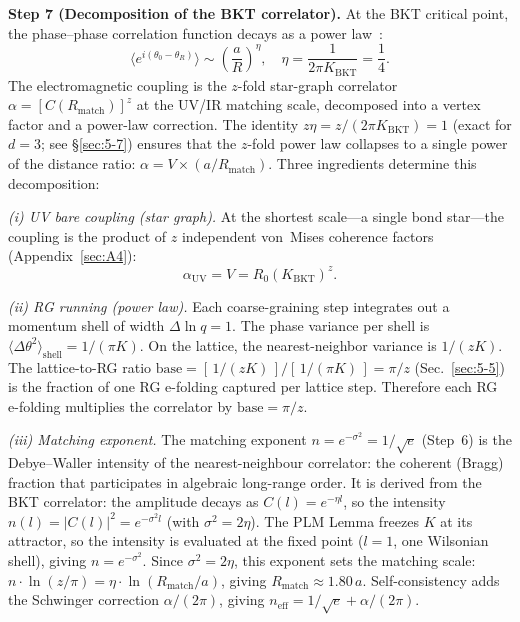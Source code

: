 \documentclass[aps,prd,onecolumn,superscriptaddress,floatfix,12pt]{revtex4-2}
\newcommand{\Rzero}{R_0}
\newcommand{\KBKT}{K_{\text{BKT}}}
\begin{document}
\textbf{Step 7 (Decomposition of the BKT correlator).} At the BKT critical point, the phase--phase correlation function decays as a power law~\cite{Kosterlitz1974}:
\begin{equation}\label{eq:bkt-corr}
\langle e^{i(\theta_0 - \theta_R)} \rangle \sim \left(\frac{a}{R}\right)^{\!\eta}, \quad \eta = \frac{1}{2\pi \KBKT} = \frac{1}{4}.
\end{equation}
The electromagnetic coupling is the $z$-fold star-graph correlator $\alpha = [C(R_{\text{match}})]^z$ at the UV/IR matching scale, decomposed into a vertex factor and a power-law correction.  The identity $z\eta = z/(2\pi\KBKT) = 1$ (exact for $d{=}3$; see \S\ref{sec:5-7}) ensures that the $z$-fold power law collapses to a single power of the distance ratio: $\alpha = V \times (a/R_{\text{match}})$.  Three ingredients determine this decomposition:

\emph{(i) UV bare coupling (star graph).} At the shortest scale---a single bond star---the coupling is the product of $z$ independent von~Mises coherence factors (Appendix~\ref{sec:A4}):
\begin{equation}
\alpha_{\text{UV}} = V = \Rzero(\KBKT)^z.
\end{equation}

\emph{(ii) RG running (power law).} Each coarse-graining step integrates out a momentum shell of width $\Delta\ln q = 1$. The phase variance per shell is $\langle\Delta\theta^2\rangle_{\text{shell}} = 1/(\pi K)$. On the lattice, the nearest-neighbor variance is $1/(zK)$. The lattice-to-RG ratio $\text{base} = [\,1/(zK)\,]/[\,1/(\pi K)\,] = \pi/z$ (Sec.~\ref{sec:5-5}) is the fraction of one RG e-folding captured per lattice step. Therefore each RG e-folding multiplies the correlator by $\text{base} = \pi/z$.

\emph{(iii) Matching exponent.} The matching exponent $n = e^{-\sigma^2} = 1/\sqrt{e}$ (Step~6) is the Debye--Waller intensity of the nearest-neighbour correlator: the coherent (Bragg) fraction that participates in algebraic long-range order.  It is derived from the BKT correlator: the amplitude decays as $C(l) = e^{-\eta l}$, so the intensity $n(l) = |C(l)|^2 = e^{-\sigma^2 l}$ (with $\sigma^2 = 2\eta$).  The PLM Lemma freezes $K$ at its attractor, so the intensity is evaluated at the fixed point ($l = 1$, one Wilsonian shell), giving $n = e^{-\sigma^2}$.  Since $\sigma^2 = 2\eta$, this exponent sets the matching scale: $n \cdot \ln(z/\pi) = \eta \cdot \ln(R_{\text{match}}/a)$, giving $R_{\text{match}} \approx 1.80\,a$.  Self-consistency adds the Schwinger correction $\alpha/(2\pi)$, giving $n_{\text{eff}} = 1/\sqrt{e} + \alpha/(2\pi)$.
\end{document}
